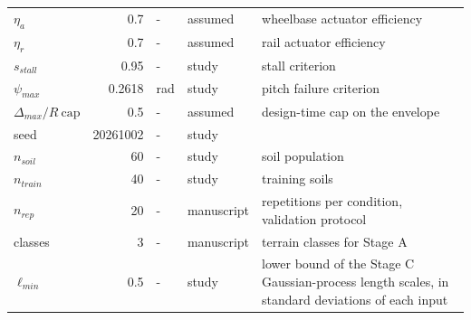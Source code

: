 \begin{table}[!ht]
\begin{tabularx}{\linewidth}{@{}l r l l X@{}}
$\eta_a$ & 0.7 & - & assumed & wheelbase actuator efficiency \\
$\eta_r$ & 0.7 & - & assumed & rail actuator efficiency \\
$s_{stall}$ & 0.95 & - & study & stall criterion \\
$\psi_{max}$ & 0.2618 & rad & study & pitch failure criterion \\
$\Delta_{max}/R\ \mathrm{cap}$ & 0.5 & - & assumed & design-time cap on the envelope \\
seed & 20261002 & - & study &  \\
$n_{soil}$ & 60 & - & study & soil population \\
$n_{train}$ & 40 & - & study & training soils \\
$n_{rep}$ & 20 & - & manuscript & repetitions per condition, validation protocol \\
classes & 3 & - & manuscript & terrain classes for Stage A \\
$\ell_{min}$ & 0.5 & - & study & lower bound of the Stage C Gaussian-process length scales, in standard deviations of each input \\
\bottomrule
\end{tabularx}
\end{table}
